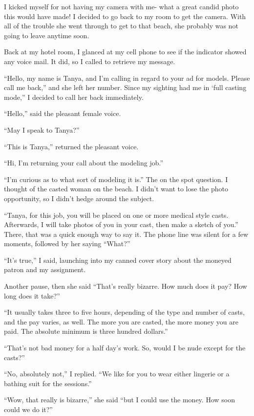 I kicked myself for not having my camera with me- what a great candid photo this would have
made! I decided to go back to my room to get the camera. With all of the trouble she went
through to get to that beach, she probably was not going to leave anytime soon.

Back at my hotel room, I glanced at my cell phone to see if the indicator showed any voice
mail. It did, so I called to retrieve my message.

``Hello, my name is Tanya, and I'm calling in regard to your ad for models. Please call me
back,'' and she left her number. Since my sighting had me in ‘full casting mode,'' I decided to
call her back immediately.

``Hello,'' said the pleasant female voice.

``May I speak to Tanya?''

``This is Tanya,'' returned the pleasant voice.

``Hi, I'm returning your call about the modeling job.''

``I'm curious as to what sort of modeling it is.'' The on the spot question. I thought of the
casted woman on the beach. I didn't want to lose the photo opportunity, so I didn't hedge around
the subject.

``Tanya, for this job, you will be placed on one or more medical style casts. Afterwards, I
will take photos of you in your cast, then make a sketch of you.'' There, that was a quick
enough
way to say it. The phone line was silent for a few moments, followed by her saying ``What?''

``It's true,'' I said, launching into my canned cover story about the moneyed patron and my
assignment.

Another pause, then she said ``That's really bizarre. How much does it pay? How long does it
take?''

``It usually takes three to five hours, depending of the type and number of casts, and the
pay varies, as well. The more you are casted, the more money you are paid. The absolute minimum
is three hundred dollars.''

``That's not bad money for a half day's work. So, would I be nude except for the casts?''

``No, absolutely not,'' I replied. ``We like for you to wear either lingerie or a bathing suit
for the sessions.''

``Wow, that really is bizarre,'' she said ``but I could use the money. How soon could we do
it?''

